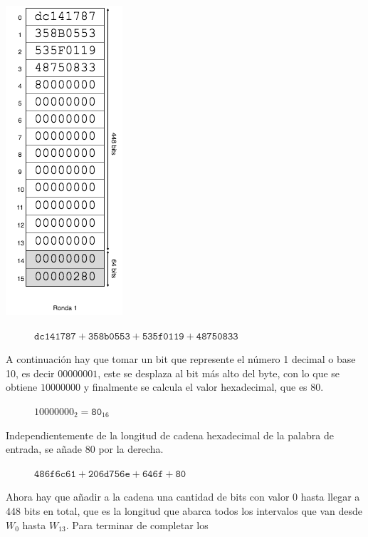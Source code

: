\documentclass{article}
\begin{document}
    \noindent\begin{minipage}{0.23\textwidth}
    \includegraphics[scale=0.59]{img/Bitcoin_block_SHA_256_W0_W15_ronda_1}
    \end{minipage}
    \hfill
    \begin{minipage}{0.67\textwidth}
    \begin{figure}[H]
    \centering
        $\texttt{dc141787} + \texttt{358b0553} + \texttt{535f0119} + \texttt{48750833}$
    \end{figure}
    A continuación hay que tomar un bit que represente el número 1 decimal o base 10, es decir $00000001$, este se desplaza al bit más alto del byte, con lo que se obtiene $10000000$ y finalmente se calcula el valor hexadecimal, que es $80$.
        \begin{figure}[H]
        \centering
            $10000000_{2} = \texttt{80}_{16}$
        \end{figure}
    Independientemente de la longitud de cadena hexadecimal de la palabra de entrada, se añade $80$ por la derecha.
        \begin{figure}[H]
        \centering
            $\texttt{486f6c61} + \texttt{206d756e} + \texttt{646f} + \texttt{80}$
        \end{figure}
    Ahora hay que añadir a la cadena una cantidad de bits con valor $0$ hasta llegar a 448 bits en total, que es la longitud que abarca todos los intervalos que van desde $W_{0}$ hasta $W_{13}$. Para terminar de completar los
    \end{minipage}
    
\end{document}
